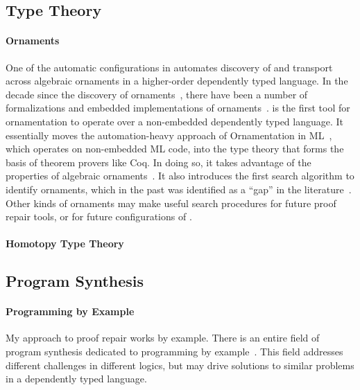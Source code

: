 \subsection{Type Theory}
\label{sec:typetheory}

\paragraph{Ornaments}
One of the automatic configurations in \toolnamec automates discovery of and transport across algebraic ornaments in a higher-order dependently typed language.
In the decade since the discovery of ornaments~\cite{mcbride}, there have been a number
of formalizations and embedded implementations of ornaments~\cite{Dagand:2013:CTO:2591370.2591396, ko2013relational, dagand2014transporting, ko2016programming, dagand2017essence}.
\toolnamec is the first tool for ornamentation to operate over a non-embedded dependently typed language.
It essentially moves the automation-heavy approach of Ornamentation in ML~\cite{Williams2017},
which operates on non-embedded ML code, into the type theory that forms the basis of theorem provers like Coq. 
In doing so, it takes advantage of the properties of algebraic ornaments~\cite{mcbride}.
It also introduces the first search algorithm to identify ornaments, which in the past 
was identified as a ``gap'' in the literature~\cite{ko2016programming}.
Other kinds of ornaments may make useful search procedures for future proof repair tools, or for future configurations of \toolnamec.

\paragraph{Homotopy Type Theory}


\subsection{Program Synthesis}
\label{sec:synthesis}

\paragraph{Programming by Example}
My approach to proof repair works by example.
There is an entire field of program synthesis dedicated to programming by example~\cite{DBLP:journals/ftpl/GulwaniPS17}. 
This field addresses different challenges in different logics,
but may drive solutions to similar problems in a dependently typed language.

